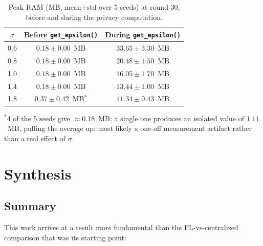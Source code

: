 \documentclass{acmart}
\begin{document}
\begin{table}[h!]
\centering
\small
\caption{Peak RAM (MB, mean$\pm$std over 5 seeds) at round 30, before and during the
privacy computation.}
\label{tab:ram}
\begin{tabular}{ccc}
\toprule
$\sigma$ & Before \texttt{get\_epsilon()} & During \texttt{get\_epsilon()} \\
\midrule
0.6 & $0.18\pm0.00$~MB & $33.65\pm3.30$~MB \\
0.8 & $0.18\pm0.00$~MB & $20.48\pm1.50$~MB \\
1.0 & $0.18\pm0.00$~MB & $16.05\pm1.70$~MB \\
1.4 & $0.18\pm0.00$~MB & $13.44\pm1.00$~MB \\
1.8 & $0.37\pm0.42$~MB$^{*}$ & $11.34\pm0.43$~MB \\
\bottomrule
\end{tabular}

\vspace{2pt}
{\footnotesize $^{*}$4 of the 5 seeds give $\approx0.18$~MB; a single one produces an
isolated value of $1.11$~MB, pulling the average up: most likely a one-off
measurement artifact rather than a real effect of $\sigma$.}
\end{table}

\section{Synthesis}

\subsection{Summary}

This work arrives at a result more fundamental than the FL-vs-centralized comparison
that was its starting point:
\end{document}
